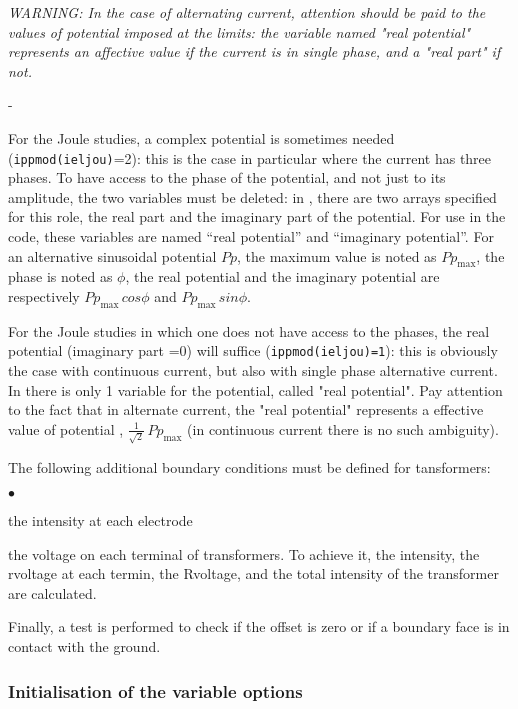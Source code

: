 {{{ {\em WARNING: In the case of alternating current, attention should be paid to the values of potential
 imposed at the limits: the variable named "real potential" represents an affective
 value if the current is in single phase, and a "real part" if not.}
\begin{list}{-}{}
\item For the Joule studies, a complex potential is sometimes needed
 (\texttt{ippmod(ieljou)}=2): this is the  case in particular where the current
 has three phases. To have access to the phase of the potential, and not just to its
 amplitude, the two variables must be deleted: in \CS, there are two arrays
 specified for this role, the real part and the imaginary
 part of the potential. For use in the code, these variables are named
 ``real potential'' and ``imaginary potential''. For an alternative
 sinusoidal potential $Pp$, the maximum value is noted as $Pp_\text{max}$,
 the phase is noted as $\phi$, the real potential
 and the imaginary potential are respectively $Pp_\text{max}\,cos\phi$ and
$Pp_\text{max}\,sin\phi$.
\item For the Joule studies in which one does not have access to the phases, the real
 potential (imaginary part =0) will suffice (\texttt{ippmod(ieljou)=1}): this is
 obviously the case with
 continuous current, but also with single phase alternative current. In \CS
there is only 1 variable for the potential,  called "real potential". Pay attention to
 the fact that in alternate current, the "real potential" represents a effective value
 of potential , $\frac{1}{\sqrt{2}}\,Pp_\text{max}$ (in continuous current there is no
 such ambiguity).
\end{list}


The following additional boundary conditions must be defined for tansformers:
\begin{list}{$\bullet$}{}
\item  the intensity at each electrode
\item  the voltage on each terminal of transformers. To achieve it, the intensity,
 the rvoltage at each termin, the Rvoltage, and the total intensity of the
transformer are calculated.
\end{list}

Finally, a test is performed to check if the offset is zero or if a boundary
 face is in contact with the ground.

\subsubsection {Initialisation of the variable options}
\label{prg_cs_user_parameters}%

}}}
